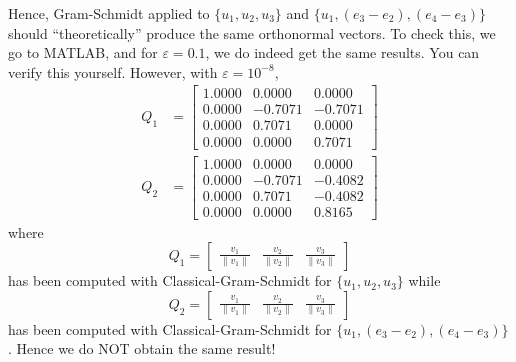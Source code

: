 \begin{example}
Hence, Gram-Schmidt applied to $\{u_1,u_2,u_3\}$ and $\{u_1,(e_3-e_2),(e_4-e_3)\}$ should ``theoretically'' produce the same orthonormal vectors. To check this, we go to MATLAB, and for $\varepsilon=0.1$, we do indeed get the same results. You can verify this yourself. However, with $\varepsilon=10^{-8}$,
\begin{align*}
    Q_1 &= \left[ \begin{array}{rrr}
  1.0000     &    0.0000     &  0.0000  \\
    0.0000 &  -0.7071  & -0.7071 \\
        0.0000  &   0.7071   &      0.0000  \\
        0.0000   &      0.0000  &  0.7071
    \end{array} \right] \\
    Q_2&=\left[ \begin{array}{rrr}
  1.0000     &    0.0000     &  0.0000  \\
    0.0000 &  -0.7071  & -0.4082 \\
        0.0000  &   0.7071   &      -0.4082  \\
        0.0000   &      0.0000  &  0.8165
    \end{array} \right] 
    \end{align*}
where $$Q_1=\begin{bmatrix} \frac{v_1}{\| v_1 \|} & \frac{v_2}{\| v_2 \|} & \frac{v_3}{\| v_3 \|}\end{bmatrix}$$
has been computed with Classical-Gram-Schmidt for $\{u_1,u_2,u_3\}$ while $$Q_2=\begin{bmatrix} \frac{v_1}{\| v_1 \|} & \frac{v_2}{\| v_2 \|} & \frac{v_3}{\| v_3 \|}\end{bmatrix}$$
has been computed with Classical-Gram-Schmidt for $\{u_1,(e_3-e_2),(e_4-e_3)\}$. Hence we do NOT obtain the same result!
\end{example}



